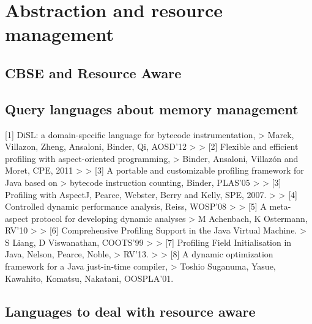 \chapter{Abstraction and resource management}
\label{chap:abstractions_and_resource_management}


\section{CBSE and Resource Aware}

\section{Query languages about memory management}

[1] DiSL: a domain-specific language for bytecode instrumentation,
>      Marek, Villazon, Zheng, Ansaloni, Binder, Qi, AOSD'12
>
> [2] Flexible and efficient profiling with aspect-oriented programming,
>      Binder, Ansaloni, Villazón and Moret, CPE, 2011
>
> [3] A portable and customizable profiling framework for Java based on
>      bytecode instruction counting, Binder, PLAS'05
>
> [3] Profiling with AspectJ, Pearce, Webster, Berry and Kelly, SPE, 2007.
>
> [4] Controlled dynamic performance analysis, Reiss, WOSP'08
>
> [5] A meta-aspect protocol for developing dynamic analyses
>      M Achenbach, K Ostermann, RV'10
>
> [6] Comprehensive Profiling Support in the Java Virtual Machine.
>      S Liang, D Viswanathan, COOTS'99
>
> [7] Profiling Field Initialisation in Java, Nelson, Pearce, Noble,
>      RV'13.
>
> [8] A dynamic optimization framework for a Java just-in-time compiler,
>      Toshio Suganuma, Yasue, Kawahito, Komatsu, Nakatani, OOSPLA'01.

\section{Languages to deal with resource aware}
